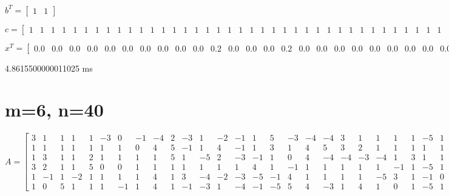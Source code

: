 \documentclass[8pt]{article}
\begin{document}
\footnotesize
$ b^T =
\begin{bmatrix}
  1  &  1 
\end{bmatrix}
$


\footnotesize
$ c =
\begin{bmatrix}
  1  &  1  &  1  &  1  &  1  &  1  &  1  &  1  &  1  &  1  &  1  &  1  &  1  &  1  &  1  &  1  &  1  &  1  &  1  &  1  &  1  &  1  &  1  &  1  &  1  &  1  &  1  &  1  &  1  &  1  &  1  &  1  &  1  &  1  &  1  &  1  &  1  &  1  &  1  &  1 
\end{bmatrix}
$


\footnotesize
$ x^T =
\begin{bmatrix}
  0.0 &  0.0 &  0.0 &  0.0 &  0.0 &  0.0 &  0.0 &  0.0 &  0.0 &  0.0 &  0.2 &  0.0 &  0.0 &  0.0 &  0.2 &  0.0 &  0.0 &  0.0 &  0.0 &  0.0 &  0.0 &  0.0 &  0.0 &  0.0 &  0.0 &  0.0 &  0.0 &  0.0 &  0.0 &  0.0 &  0.0 &  0.0 &  0.0 &  0.0 &  0.0 &  0.0 &  0.0 &  0.0 &  0.0 &  0.0
\end{bmatrix}
$


4.8615500000011025  ms


\section{ m=6, n=40 }



\footnotesize
$ A =
\begin{bmatrix}
  3  &  1  &  1  &  1  &  1  & -3  &  0  & -1  & -4  &  2  & -3  &  1  & -2  & -1  &  1  &  5  & -3  & -4  & -4  &  3  &  1  &  1  &  1  &  1  & -5  &  1  & -1  & -1  &  0  &  2  &  1  &  1  & -2  & -4  &  1  & -5  &  1  & -4  & -4  & -1 \\
  1  &  1  &  1  &  1  &  1  &  1  &  1  &  0  &  4  &  5  & -1  &  1  &  4  & -1  &  1  &  3  &  1  &  4  &  5  &  3  &  2  &  1  &  1  &  1  &  1  &  1  &  1  &  4  &  1  & -4  & -4  &  1  &  1  &  1  & -4  &  1  &  3  &  1  & -5  &  2 \\
  1  &  3  &  1  &  1  &  2  &  1  &  1  &  1  &  1  &  5  &  1  & -5  &  2  & -3  & -1  &  1  &  0  &  4  & -4  & -4  & -3  & -4  &  1  &  3  &  1  &  1  &  0  &  4  & -4  &  1  & -4  &  1  &  1  &  1  &  1  &  1  &  1  & -4  &  1  & -2 \\
  3  &  2  &  1  &  1  &  5  &  0  &  0  &  1  &  1  &  1  &  1  &  1  &  1  &  1  &  4  &  1  & -1  &  1  &  1  &  1  &  1  &  1  & -1  &  1  & -5  &  1  &  0  &  1  & -3  &  1  &  4  &  1  & -5  &  1  & -5  &  1  & -4  &  1  &  1  &  1 \\
  1  & -1  &  1  & -2  &  1  &  1  &  1  &  1  &  4  &  1  &  3  & -4  & -2  & -3  & -5  & -1  &  4  &  1  &  1  &  1  &  1  & -5  &  3  &  1  & -1  &  0  &  1  &  1  &  1  &  1  &  1  &  0  & -4  & -1  &  1  &  1  & -4  & -5  &  1  &  1 \\
  1  &  0  &  5  &  1  &  1  &  1  & -1  &  1  &  4  &  1  & -1  & -3  &  1  & -4  & -1  & -5  &  5  &  4  & -3  &  1  &  4  &  1  &  0  &  1  & -5  &  1  &  1  & -2  &  4  &  2  &  1  &  1  & -5  &  2  &  1  &  4  &  1  &  1  &  1  &  5 
\end{bmatrix}
$
\end{document}
